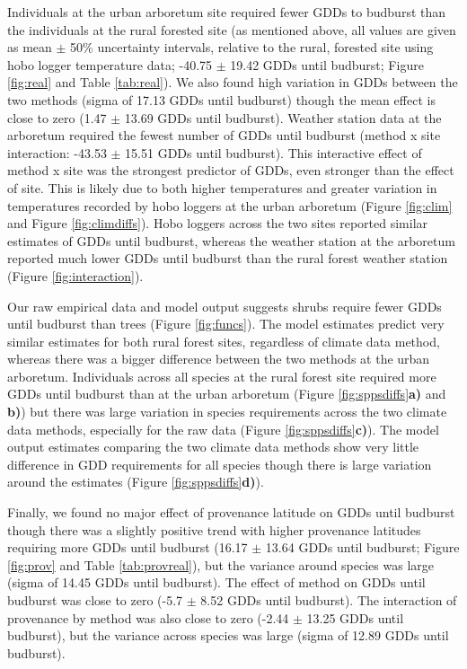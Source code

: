 \documentclass{article}\usepackage[]{graphicx}\usepackage[]{color}
\begin{document}
Individuals at the urban arboretum site required fewer GDDs to budburst than the individuals at the rural forested site (as mentioned above, all values are given as mean $\pm$ 50\% uncertainty intervals, relative to the rural, forested site using hobo logger temperature data; -40.75 $\pm$ 19.42 GDDs until budburst; Figure \ref{fig:real} and Table \ref{tab:real}). We also found high variation in GDDs between the two methods (sigma of 17.13 GDDs until budburst) though the mean effect is close to zero (1.47 $\pm$ 13.69 GDDs until budburst). Weather station data at the arboretum required the fewest number of GDDs until budburst (method x site interaction: -43.53 $\pm$ 15.51 GDDs until budburst). This interactive effect of method x site was the strongest predictor of GDDs, even stronger than the effect of site. This is likely due to both higher temperatures and greater variation in temperatures recorded by hobo loggers at the urban arboretum (Figure \ref{fig:clim} and Figure \ref{fig:climdiffs}). Hobo loggers across the two sites reported similar estimates of GDDs until budburst, whereas the weather station at the arboretum reported much lower GDDs until budburst than the rural forest weather station (Figure \ref{fig:interaction}).

Our raw empirical data and model output suggests shrubs require fewer GDDs until budburst than trees (Figure \ref{fig:funcs}). The model estimates predict very similar estimates for both rural forest sites, regardless of climate data method, whereas there was a bigger difference between the two methods at the urban arboretum. Individuals across all species at the rural forest site required more GDDs until budburst than at the urban arboretum (Figure \ref{fig:sppsdiffs}\textbf{a)} and \textbf{b)}) but there was large variation in species requirements across the two climate data methods, especially for the raw data (Figure \ref{fig:sppsdiffs}\textbf{c)}). The model output estimates comparing the two climate data methods show very little difference in GDD requirements for all species though there is large variation around the estimates (Figure \ref{fig:sppsdiffs}\textbf{d)}). 

Finally, we found no major effect of provenance latitude on GDDs until budburst though there was a slightly positive trend with higher provenance latitudes requiring more GDDs until budburst (16.17 $\pm$ 13.64 GDDs until budburst; Figure \ref{fig:prov} and Table \ref{tab:provreal}), but the variance around species was large (sigma of 14.45 GDDs until budburst). The effect of method on GDDs until budburst was close to zero (-5.7 $\pm$ 8.52 GDDs until budburst). The interaction of provenance by method was also close to zero (-2.44 $\pm$ 13.25 GDDs until budburst), but the variance across species was large (sigma of 12.89 GDDs until budburst).
\end{document}
